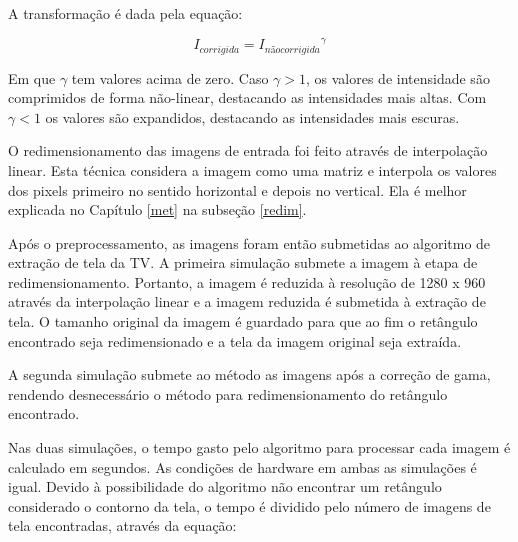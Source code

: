 

A transformação é dada pela equação:

\begin{equation}
I_{corrigida} = {I_{não corrigida}}^\gamma
\end{equation}

Em que $\gamma$ tem valores acima de zero. Caso $\gamma >1$, os valores de intensidade são comprimidos de forma não-linear, destacando as intensidades mais altas. Com $\gamma <1$ os valores são expandidos, destacando as intensidades mais escuras.


O redimensionamento das imagens de entrada foi feito através de interpolação linear. Esta técnica considera a imagem como uma matriz e interpola os valores dos pixels primeiro no sentido horizontal e depois no vertical. Ela é melhor explicada no Capítulo \ref{met} na subseção \ref{redim}. %
 

Após o preprocessamento, as imagens foram então submetidas ao algoritmo de extração de tela da TV. A primeira simulação submete a imagem à etapa de redimensionamento. Portanto, a imagem é reduzida à resolução de 1280 x 960 através da interpolação linear e a imagem reduzida é submetida à extração de tela. O tamanho original da imagem é guardado para que ao fim o retângulo encontrado seja redimensionado e a tela da imagem original seja extraída. %

A segunda simulação submete ao método as imagens após a correção de gama, rendendo desnecessário o método para redimensionamento do retângulo encontrado.


Nas duas simulações, o tempo gasto pelo algoritmo para processar cada imagem é calculado em segundos. As condições de hardware em ambas as simulações é igual. Devido à possibilidade do algoritmo não encontrar um retângulo considerado o contorno da tela, o tempo é dividido pelo número de imagens de tela encontradas, através da equação:

